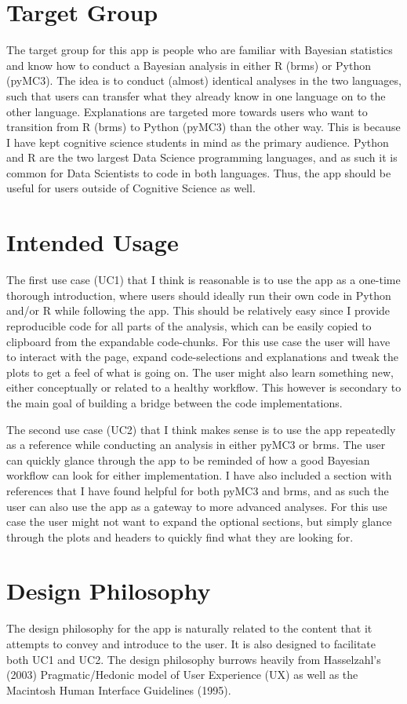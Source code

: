 \documentclass[12pt]{article}
\begin{document}
\section{Target Group}
The target group for this app is people who are familiar with Bayesian statistics and know
how to conduct a Bayesian analysis in either R (brms) or Python (pyMC3). The idea is to
conduct (almost) identical analyses in the two languages, such that users can
transfer what they already know in one language on to the other language.
Explanations are targeted more towards users who want to transition from R (brms)
to Python (pyMC3) than the other way. This is because I have kept cognitive science students
in mind as the primary audience. Python and R are the two largest Data Science programming
languages, and as such it is common for Data Scientists to code in both languages.
Thus, the app should be useful for users outside of Cognitive Science as well.

\section{Intended Usage}
The first use case (UC1) that I think is reasonable is to use the app as a one-time
thorough introduction, where users should ideally run their own code in Python and/or R
while following the app. This should be relatively easy since I provide reproducible code
for all parts of the analysis, which can be easily copied to clipboard from the expandable
code-chunks. For this use case the user will have to interact with the page,
expand code-selections and explanations and tweak the plots to get a feel of what is going on.
The user might also learn something new, either conceptually or related to a healthy workflow.
This however is secondary to the main goal of building a bridge between the code implementations.

The second use case (UC2) that I think makes sense is to use the app repeatedly as a reference
while conducting an analysis in either pyMC3 or brms. The user can quickly glance through the
app to be reminded of how a good Bayesian workflow can look for either implementation.
I have also included a section with references that I have found helpful for both pyMC3 and brms,
and as such the user can also use the app as a gateway to more advanced analyses.
For this use case the user might not want to expand the optional sections,
but simply glance through the plots and headers to quickly find what they are looking for.

\section{Design Philosophy}
The design philosophy for the app is naturally related to the content that it attempts to convey and
introduce to the user. It is also designed to facilitate both UC1 and UC2.
The design philosophy burrows heavily from Hasselzahl’s (2003) Pragmatic/Hedonic model
of User Experience (UX) as well as the Macintosh Human Interface Guidelines (1995).
\end{document}
